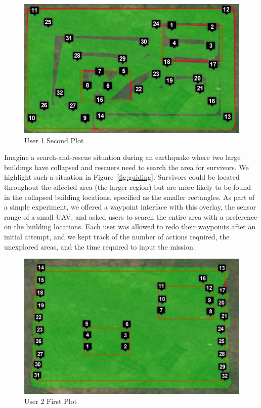 \documentclass{sig-alternate-ipsn13}
\begin{document}
\begin{figure}[h]
  \centering
  \includegraphics[scale=0.4]{user_waypoints_2}
  \caption{User 1 Second Plot}
  \label{fig:user1_2}
\end{figure}


Imagine a search-and-rescue situation during an earthquake where two large
buildings have collapsed and rescuers need to search the area for survivors. We
highlight such a situation in Figure~\ref{fig:guiding}. Survivors could be located
throughout the affected area (the larger region) but are more likely to be found
in the collapsed building locations, specified as the smaller rectangles. As part
of a simple experiment, we offered a waypoint interface with this overlay, the
sensor range of a small UAV, and asked users to search the entire area with
a preference on the building locations. Each user was allowed to redo their
waypoints after an initial attempt, and we kept track of the number of actions
required, the unexplored areas, and the time required to input the mission.

\iffalse

\begin{figure}[h]
  \centering
  \includegraphics[scale=0.45]{user_waypoints_3}
  \caption{User 2 First  Plot}
  \label{fig:user2_1}
\end{figure}
\end{document}
